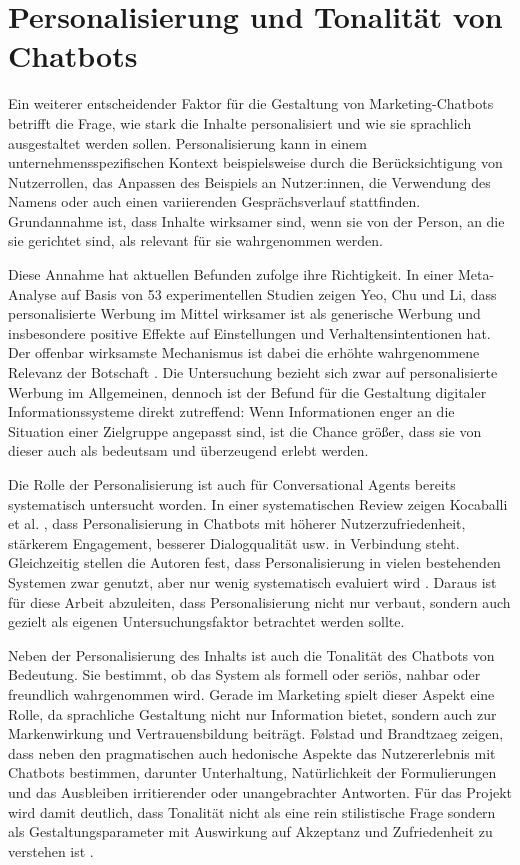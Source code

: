 \section{Personalisierung und Tonalität von Chatbots}

Ein weiterer entscheidender Faktor für die Gestaltung von Marketing-Chatbots betrifft
die Frage, wie stark die Inhalte personalisiert und wie sie sprachlich
ausgestaltet werden sollen. Personalisierung kann in einem
unternehmensspezifischen Kontext beispielsweise durch die Berücksichtigung von
Nutzerrollen, das Anpassen des Beispiels an Nutzer:innen, die Verwendung des Namens oder auch
einen variierenden Gesprächsverlauf stattfinden. Grundannahme ist, dass
Inhalte wirksamer sind, wenn sie von der Person, an die sie gerichtet sind,
als relevant für sie wahrgenommen werden.

Diese Annahme hat aktuellen Befunden zufolge ihre Richtigkeit. In einer
Meta-Analyse auf Basis von 53 experimentellen Studien zeigen Yeo, Chu und
Li, dass personalisierte Werbung im Mittel wirksamer ist als generische
Werbung und insbesondere positive Effekte auf Einstellungen und
Verhaltensintentionen hat. Der offenbar wirksamste Mechanismus ist dabei die
erhöhte wahrgenommene Relevanz der Botschaft 
\cite{Yeo2025metaPersonalizedAdvertising}. Die Untersuchung bezieht sich
zwar auf personalisierte Werbung im Allgemeinen, dennoch ist der Befund für
die Gestaltung digitaler Informationssysteme direkt zutreffend: Wenn
Informationen enger an die Situation einer Zielgruppe angepasst sind, ist die
Chance größer, dass sie von dieser auch als bedeutsam und überzeugend
erlebt werden.

Die Rolle der Personalisierung ist auch für Conversational Agents bereits 
systematisch untersucht worden. In einer systematischen Review zeigen 
Kocaballi et al. , dass Personalisierung in Chatbots mit höherer 
Nutzerzufriedenheit, stärkerem Engagement, besserer Dialogqualität usw. in 
Verbindung steht. Gleichzeitig stellen die Autoren fest, dass Personalisierung in 
vielen bestehenden Systemen zwar genutzt, aber nur wenig systematisch evaluiert 
wird \cite{Kocaballi2019}. Daraus ist für diese Arbeit abzuleiten, dass Personalisierung nicht nur 
verbaut, sondern auch gezielt als eigenen Untersuchungsfaktor betrachtet werden 
sollte.


Neben der Personalisierung des Inhalts ist auch die Tonalität des Chatbots von 
Bedeutung. Sie bestimmt, ob das System als formell oder seriös, nahbar oder 
freundlich wahrgenommen wird. Gerade im Marketing spielt dieser Aspekt eine Rolle, 
da sprachliche Gestaltung nicht nur Information bietet, sondern auch zur 
Markenwirkung und Vertrauensbildung beiträgt. Følstad und Brandtzaeg zeigen, dass 
neben den pragmatischen auch hedonische Aspekte das Nutzererlebnis mit Chatbots 
bestimmen, darunter Unterhaltung, Natürlichkeit der Formulierungen und das 
Ausbleiben irritierender oder unangebrachter Antworten. Für das Projekt wird 
damit deutlich, dass Tonalität nicht als eine rein stilistische Frage sondern als 
Gestaltungsparameter mit Auswirkung auf Akzeptanz und Zufriedenheit zu verstehen 
ist \cite{Folstad2020}.


